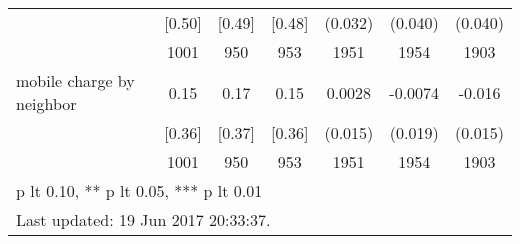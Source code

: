 \begin{table}[htbp]
\begin{tabular*}{1\hsize}{@{\hskip\tabcolsep\extracolsep\fill}l*{1}{cccccc}}
                                &   [0.50]&   [0.49]&   [0.48]&  (0.032)         &  (0.040)         &  (0.040)         \\
                                &     1001&      950&      953&     1951         &     1954         &     1903         \\
mobile charge by neighbor       &     0.15&     0.17&     0.15&   0.0028         &  -0.0074         &   -0.016         \\
                                &   [0.36]&   [0.37]&   [0.36]&  (0.015)         &  (0.019)         &  (0.015)         \\
                                &     1001&      950&      953&     1951         &     1954         &     1903         \\
\bottomrule
\multicolumn{7}{l}{\footnotesize * p lt 0.10, ** p lt 0.05, *** p lt 0.01}\\
\multicolumn{7}{l}{\footnotesize Last updated: 19 Jun 2017 20:33:37.}\\
\end{tabular*}
\end{table}

